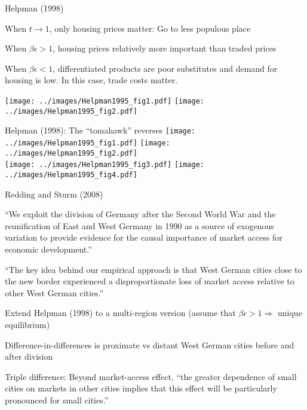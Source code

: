 \documentclass[10pt,notes=hide]{beamer}
\begin{document}
\begin{frame}{Helpman (1998)}
\begin{itemize}
{\small
	\item When $t \to 1$, only housing prices matter: Go to less populous place
	\item When $\beta\epsilon>1$, housing prices relatively more important than traded prices
	\item When $\beta\epsilon<1$, differentiated products are poor substitutes and demand for housing is low. In this case, trade costs matter.
}
\end{itemize}
\texttt{[image: ../images/Helpman1995\_fig1.pdf]}
\texttt{[image: ../images/Helpman1995\_fig2.pdf]}
\end{frame}
\begin{frame}{Helpman (1998): The ``tomahawk'' reverses}
\texttt{[image: ../images/Helpman1995\_fig1.pdf]}
\texttt{[image: ../images/Helpman1995\_fig2.pdf]} \\
\texttt{[image: ../images/Helpman1995\_fig3.pdf]}
\texttt{[image: ../images/Helpman1995\_fig4.pdf]}
\end{frame}
\begin{frame}{Redding and Sturm (2008)}
\begin{itemize}
{\small
	\item ``We exploit the division of Germany after the Second World War and the reunification of East and West Germany in 1990 as a source of exogenous variation to provide evidence for the causal importance of market access for economic development.''
	\item ``The key idea behind our empirical approach is that West German cities close to the new border experienced a disproportionate loss of market access relative to other West German cities.''
	\item Extend Helpman (1998) to a multi-region version (assume that $\beta\epsilon>1 \Rightarrow$ unique equilibrium)
	\item Difference-in-differences is proximate vs distant West German cities before and after division
	\item Triple difference: Beyond market-access effect, ``the greater dependence of small cities on markets in other cities implies that this effect will be particularly pronounced for small cities.''
}
\end{itemize}
\end{frame}
\end{document}
